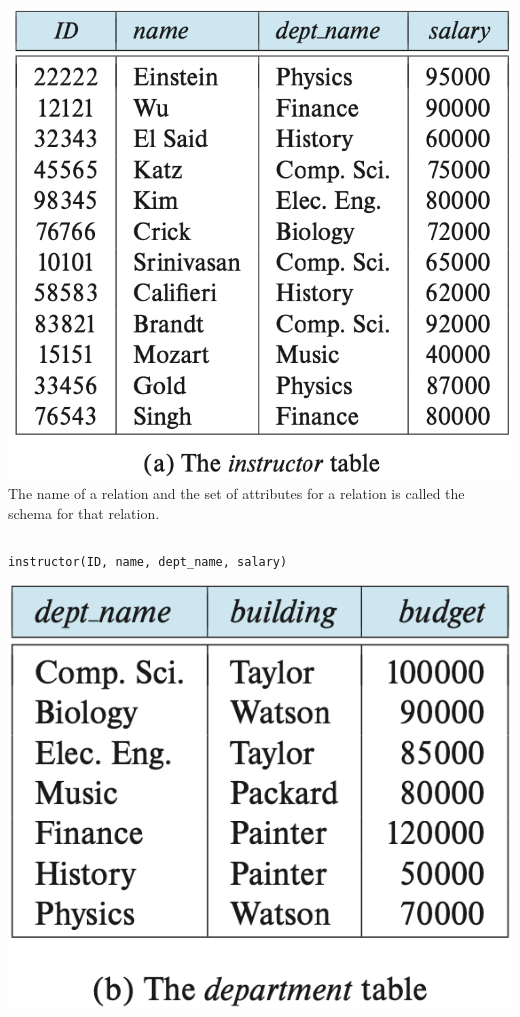 \documentclass[aspectratio=169, 14pt]{beamer}
\begin{document}
\begin{frame}
    \begin{columns}
        \includegraphics[height=.7\paperheight]{table/instructor}
        The name of a relation and the set of attributes for a relation is called the \alert{schema} for that relation.
    \end{columns}
    \texttt{instructor(ID, name, dept\_name, salary)}
\end{frame}
\begin{frame}

    \begin{center}
        \includegraphics[height=.7\paperheight]{table/department}
    \end{center}
\end{frame}
\end{document}
